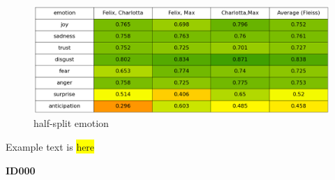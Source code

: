 \documentclass[a4,12pt]{scrartcl}
\begin{document}
\begin{figure}
	\centering
	\includegraphics[width=0.7\linewidth]{emotion-eval-half_split}
	\caption[]{half-split emotion}
	\label{fig:emotion-eval-half_split}
\end{figure}



\begin{center} %
\begin{tcolorbox}[width=40mm] %
\begin{itshape}
Example text is \colorbox{yellow}{here} %
\end{itshape}
\flushright \textbf{ID000} %
\end{tcolorbox}
\end{center}
\end{document}
